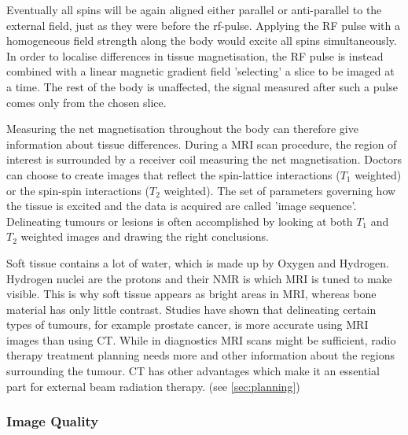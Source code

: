 Eventually all spins will be again aligned either parallel or anti-parallel to the external field, just as they were before the rf-pulse. 
Applying the RF pulse with a homogeneous field strength along the body would excite all spins simultaneously.
In order to localise differences in tissue magnetisation, the RF pulse is instead combined with a linear magnetic gradient field 'selecting' a slice to be imaged at a time.
The rest of the body is unaffected, the signal measured after such a pulse comes only from the chosen slice.

Measuring the net magnetisation throughout the body can therefore give information about tissue differences.
During a MRI scan procedure, the region of interest is surrounded by a receiver coil measuring the net magnetisation.
Doctors can choose to create images that reflect the spin-lattice interactions ($T_1$ weighted) or the spin-spin interactions ($T_2$ weighted). 
The set of parameters governing how the tissue is excited and the data is acquired are called 'image sequence'.
Delineating tumours or lesions is often accomplished by looking at both $T_1$ and $T_2$ weighted images and drawing the right conclusions.

Soft tissue contains a lot of water, which is made up by Oxygen and Hydrogen. Hydrogen nuclei are the protons and their NMR is which MRI is tuned to make visible. This is why soft tissue appears as bright areas in MRI, whereas bone material has only little contrast. \cite{Currie2013}
Studies have shown that delineating certain types of tumours, for example prostate cancer, is more accurate using MRI images than using CT. \cite{Rasch1999, Debois1999a, Roach1996}
While in diagnostics MRI scans might be sufficient, radio therapy treatment planning needs more and other information about the regions surrounding the tumour. CT has other advantages which make it an essential part for external beam radiation therapy. (see \ref{sec:planning})

\subsubsection{Image Quality}

